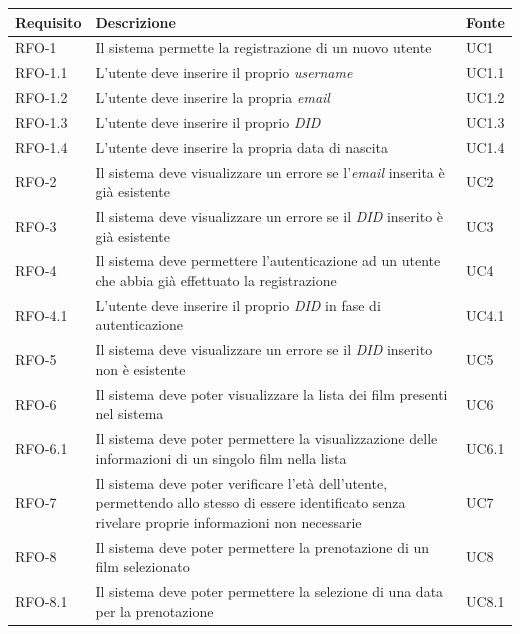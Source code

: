 \begin{center}
\label{tab:requisiti-funzionali}
\begin{tabularx}{\textwidth}{|>{\hsize=0.4\hsize\centering\arraybackslash}X|>{\hsize=2.2\hsize\centering}X|>{\hsize=0.4\hsize\centering\arraybackslash}X|}
\hline
\textbf{Requisito} & \textbf{Descrizione} & \textbf{Fonte}\\
\hline
RFO-1     & Il sistema permette la registrazione di un nuovo utente & UC1 \\
\hline
RFO-1.1   & L'utente deve inserire il proprio \textit{username} & UC1.1 \\
\hline
RFO-1.2   & L'utente deve inserire la propria \textit{email} & UC1.2 \\
\hline
RFO-1.3   & L'utente deve inserire il proprio \textit{DID} & UC1.3 \\
\hline
RFO-1.4   & L'utente deve inserire la propria data di nascita & UC1.4 \\
\hline
RFO-2   & Il sistema deve visualizzare un errore se l'\textit{email} inserita è già esistente & UC2 \\
\hline
RFO-3   & Il sistema deve visualizzare un errore se il \textit{DID} inserito è già esistente & UC3 \\
\hline
RFO-4   & Il sistema deve permettere l'autenticazione ad un utente che abbia già effettuato la registrazione & UC4 \\
\hline
RFO-4.1   & L'utente deve inserire il proprio \textit{DID} in fase di autenticazione & UC4.1 \\
\hline
RFO-5   & Il sistema deve visualizzare un errore se il \textit{DID} inserito non è esistente & UC5 \\
\hline
RFO-6 & Il sistema deve poter visualizzare la lista dei film presenti nel sistema & UC6 \\
\hline
RFO-6.1 & Il sistema deve poter permettere la visualizzazione delle informazioni di un singolo film nella lista & UC6.1 \\
\hline
RFO-7 & Il sistema deve poter verificare l'età dell'utente, permettendo allo stesso di essere identificato senza rivelare proprie informazioni non necessarie & UC7 \\
\hline
RFO-8 & Il sistema deve poter permettere la prenotazione di un film selezionato & UC8 \\
\hline
RFO-8.1 & Il sistema deve poter permettere la selezione di una data per la prenotazione & UC8.1 \\

\end{tabularx}
\end{center}

